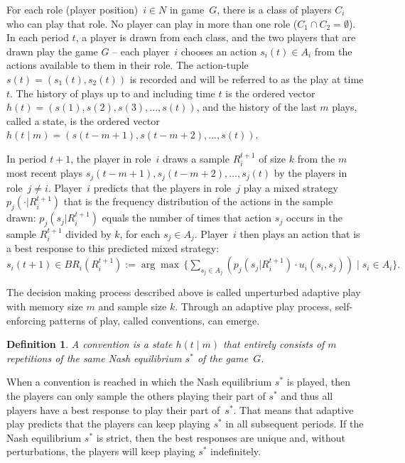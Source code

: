 \documentclass[11.5pt]{article}
\newtheorem{definition}{Definition}
\begin{document}
For each role (player position)~$i\in N$ in game~$G$, there is a class of players $C_i$ who can play that role. No player can play in more than one role ($C_1\cap C_2=\emptyset$). 
In each period $t$, a player is drawn from each class, and the two players that are drawn play the game $G$ -- each player~$i$ chooses an action $s_i(t)\in A_i$ from the actions available to them in their role. 
The action-tuple $s(t) = (s_1(t), s_2(t))$ is recorded and will be referred to as the play at time $t$. 
The history of plays up to and including time $t$ is the ordered vector $h(t) = (s(1), s(2), s(3), ..., s(t))$, and the history of the last $m$ plays, called a state, is the ordered vector $h(t\mid m) = (s(t-m+1), s(t-m+2), ..., s(t))$.

In period $t+1$, the player in role~$i$ draws a sample $R_i^{t+1}$ of size $k$ from the $m$ most recent plays $s_j(t-m+1), s_j(t-m+2), \ldots, s_j(t)$ by the players in role~$j\neq i$. 
Player~$i$ predicts that the players in role~$j$ play a mixed strategy $p_j(\cdot | R_i^{t+1})$ that is the frequency distribution of the actions in the sample drawn: $p_j(s_j | R_i^{t+1})$ equals the number of times that action $s_j$ occurs in the sample $R_i^{t+1}$ divided by $k$, for each $s_j\in A_j$. 
%
Player~$i$ then plays an action that is a best response to this predicted mixed strategy:  
$s_i(t+1)\in BR_i(R_i^{t+1}):=\arg\max \,\{ \sum_{s_j\in A_j} \left( p_j(s_j | R_i^{t+1})\cdot u_i(s_i,s_j) \right) \mid s_i\in A_i \} .$




\bigskip

The decision making process described above is called unperturbed adaptive play with memory size $m$ and sample size $k$. Through an adaptive play process, self-enforcing patterns of play, called conventions, can emerge.


\begin{definition}
A {\emph{convention}} is a state $h(t\mid m)$ that entirely consists of $m$ repetitions of the same Nash equilibrium $s^*$ of the game~$G$.
\end{definition}

When a convention is reached in which the Nash equilibrium $s^*$ is played, then the players can only sample the others playing their part of $s^*$ and thus all players have a best response to play their part of~$s^*$. That means that adaptive play predicts that the players can keep playing $s^*$ in all subsequent periods. If the Nash equilibrium $s^*$ is strict, then the best responses are unique and, without perturbations, the players will keep playing $s^*$ indefinitely. 
\end{document}
